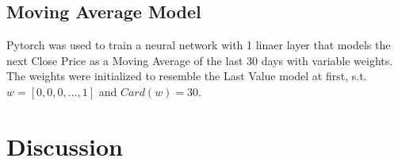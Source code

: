 \documentclass[utf8x]{ctexart}
\begin{document}
\subsection{Moving Average Model}

Pytorch was used to train a neural network with 1 linaer layer that models the next Close Price as a Moving Average of the last 30 days with variable weights. The weights were initialized to resemble the Last Value model at first, s.t. $w = [0,0,0,\dots,1]$ and $Card(w) = 30$.




\section{Discussion}
\end{document}
